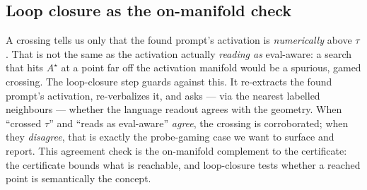 \subsection{Loop closure as the on-manifold check}

A crossing tells us only that the found prompt's activation is \emph{numerically}
above $\tau$. That is not the same as the activation actually \emph{reading as}
eval-aware: a search that hits $A^\star$ at a point far off the activation manifold
would be a spurious, gamed crossing. The loop-closure step guards against this. It
re-extracts the found prompt's activation, re-verbalizes it, and asks --- via the
nearest labelled neighbours --- whether the language readout agrees with the
geometry. When ``crossed $\tau$'' and ``reads as eval-aware'' \emph{agree}, the
crossing is corroborated; when they \emph{disagree}, that is exactly the
probe-gaming case we want to surface and report. This agreement check is the
on-manifold complement to the certificate: the certificate bounds what is reachable,
and loop-closure tests whether a reached point is semantically the concept.
